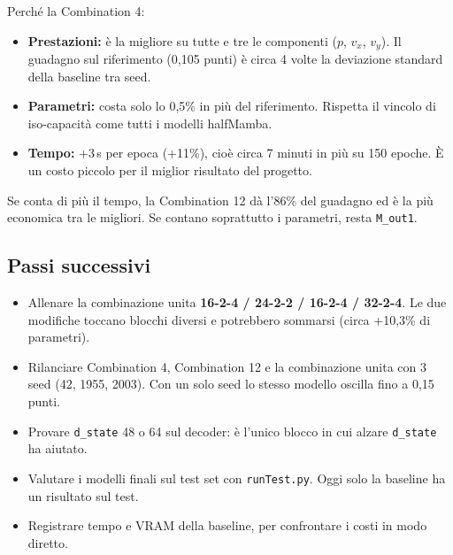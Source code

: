 \documentclass[11pt,a4paper]{article}
\newcommand{\cfg}[1]{\texttt{#1}}
\begin{document}
\noindent Perché la Combination 4:
\begin{itemize}
  \item \textbf{Prestazioni:} è la migliore su tutte e tre le componenti ($p$, $v_x$, $v_y$). Il guadagno sul riferimento (0,105 punti) è circa 4 volte la deviazione standard della baseline tra seed.
  \item \textbf{Parametri:} costa solo lo 0,5\% in più del riferimento. Rispetta il vincolo di iso-capacità come tutti i modelli halfMamba.
  \item \textbf{Tempo:} +3\,s per epoca (+11\%), cioè circa 7 minuti in più su 150 epoche. È un costo piccolo per il miglior risultato del progetto.
\end{itemize}

Se conta di più il tempo, la Combination 12 dà l'86\% del guadagno ed è la più economica tra le migliori. Se contano soprattutto i parametri, resta \cfg{M\_out1}.

\subsection*{Passi successivi}
\begin{itemize}[label=$\square$]
  \item Allenare la combinazione unita \textbf{16-2-4 / 24-2-2 / 16-2-4 / 32-2-4}. Le due modifiche toccano blocchi diversi e potrebbero sommarsi (circa +10,3\% di parametri).
  \item Rilanciare Combination 4, Combination 12 e la combinazione unita con 3 seed (42, 1955, 2003). Con un solo seed lo stesso modello oscilla fino a 0,15 punti.
  \item Provare \cfg{d\_state} 48 o 64 sul decoder: è l'unico blocco in cui alzare \cfg{d\_state} ha aiutato.
  \item Valutare i modelli finali sul test set con \cfg{runTest.py}. Oggi solo la baseline ha un risultato sul test.
  \item Registrare tempo e VRAM della baseline, per confrontare i costi in modo diretto.
\end{itemize}
\end{document}
